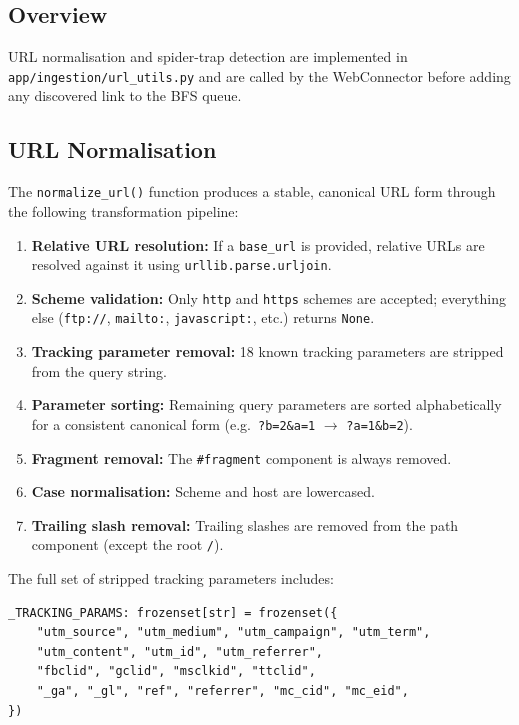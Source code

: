 \documentclass[12pt,a4paper]{article}
\begin{document}
\subsection{Overview}

URL normalisation and spider-trap detection are implemented in \texttt{app/ingestion/url\_utils.py} and are called by the WebConnector before adding any discovered link to the BFS queue.

\subsection{URL Normalisation}

The \texttt{normalize\_url()} function produces a stable, canonical URL form through the following transformation pipeline:

\begin{enumerate}[noitemsep]
  \item \textbf{Relative URL resolution:} If a \texttt{base\_url} is provided, relative URLs are resolved against it using \texttt{urllib.parse.urljoin}.
  \item \textbf{Scheme validation:} Only \texttt{http} and \texttt{https} schemes are accepted; everything else (\texttt{ftp://}, \texttt{mailto:}, \texttt{javascript:}, etc.) returns \texttt{None}.
  \item \textbf{Tracking parameter removal:} 18 known tracking parameters are stripped from the query string.
  \item \textbf{Parameter sorting:} Remaining query parameters are sorted alphabetically for a consistent canonical form (e.g.\ \texttt{?b=2\&a=1} $\to$ \texttt{?a=1\&b=2}).
  \item \textbf{Fragment removal:} The \texttt{\#fragment} component is always removed.
  \item \textbf{Case normalisation:} Scheme and host are lowercased.
  \item \textbf{Trailing slash removal:} Trailing slashes are removed from the path component (except the root \texttt{/}).
\end{enumerate}

The full set of stripped tracking parameters includes:

\begin{lstlisting}[style=pythonstyle, caption={Tracking parameters stripped during normalisation}]
_TRACKING_PARAMS: frozenset[str] = frozenset({
    "utm_source", "utm_medium", "utm_campaign", "utm_term",
    "utm_content", "utm_id", "utm_referrer",
    "fbclid", "gclid", "msclkid", "ttclid",
    "_ga", "_gl", "ref", "referrer", "mc_cid", "mc_eid",
})
\end{lstlisting}
\end{document}
